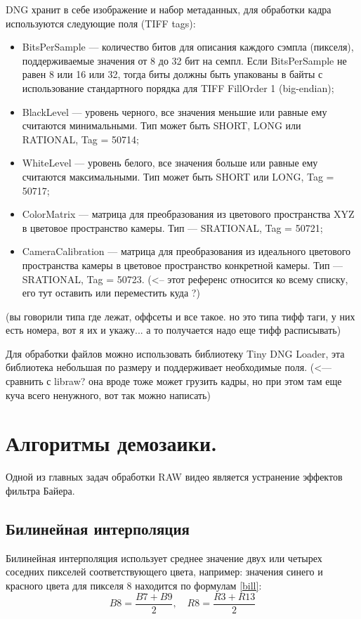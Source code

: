 DNG хранит в себе изображение и набор метаданных, для обработки кадра используются следующие поля (TIFF tags):
\begin{itemize}
	\item BitsPerSample --- количество битов для описания каждого сэмпла (пикселя), поддерживаемые значения от 8 до 32 бит на семпл. Если BitsPerSample не равен 8 или 16 или 32, тогда биты должны быть упакованы в байты с использование стандартного порядка для TIFF FillOrder 1 (big-endian);
	\item BlackLevel --- уровень черного, все значения меньшие или равные ему считаются минимальными. Тип может быть SHORT, LONG или RATIONAL, Tag = 50714;
	\item WhiteLevel --- уровень белого, все значения больше или равные ему считаются максимальными. Тип может быть SHORT или LONG, Tag = 50717;
	\item ColorMatrix --- матрица для преобразования из цветового пространства XYZ в цветовое пространство камеры. Тип --- SRATIONAL, Tag = 50721;
	\item CameraCalibration --- матрица для преобразования из идеального цветового пространства камеры в цветовое пространство конкретной камеры. Тип --- SRATIONAL, Tag = 50723. \cite{dngspec} (<-- этот референс относится ко всему списку, его тут оставить или переместить куда ?)
\end{itemize}

(вы говорили типа где лежат, оффсеты и все такое. но это типа тифф таги, у них есть номера, вот я их и укажу... а то получается надо еще тифф расписывать)

Для обработки файлов можно использовать библиотеку \guillemotleft Tiny DNG Loader\guillemotright, эта библиотека небольшая по размеру и поддерживает необходимые поля. (<--- сравнить с libraw? она вроде тоже может грузить кадры, но при этом там еще куча всего ненужного, вот так можно написать)
\section{Алгоритмы демозаики.}

Одной из главных задач обработки RAW видео является устранение эффектов фильтра Байера.


\subsection{Билинейная интерполяция}
Билинейная интерполяция использует среднее значение двух или четырех соседних пикселей соответствующего цвета, например: значения синего и красного цвета для пикселя 8 находится по формулам \ref{bill}:
\begin{equation}
	\label{bill}
	B8 = \frac{B7 + B9}{2},
	\quad	
	R8 = \frac{R3 + R13}{2}
\end{equation}


